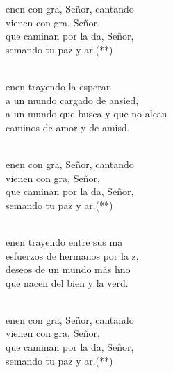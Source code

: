 \begin{cancion}%
	\begin{chorus}%
	enen con gra, Señor, cantando\\
	vienen con gra, Señor,\\
	 que caminan por la da, Señor,\\
	semando tu paz y ar.(**)\\
	\end{chorus}%
	\jump\\
	enen trayendo la esperan\\
	a un mundo cargado de ansied,\\
	a un mundo que busca y que no alcan\\
	caminos de amor y de amisd.\\\jump\\
	\begin{chorus}%
	enen con gra, Señor, cantando\\
	vienen con gra, Señor,\\
	 que caminan por la da, Señor,\\
	semando tu paz y ar.(**)\\
	\end{chorus}%
	\jump\\
	enen trayendo entre sus ma\\
	esfuerzos de hermanos por la z,\\
	deseos de un mundo más hno\\
	que nacen del bien y la verd.\\\jump\\
	\begin{chorus}%
	enen con gra, Señor, cantando\\
	vienen con gra, Señor,\\
	 que caminan por la da, Señor,\\
	semando tu paz y ar.(**)\\
	\end{chorus}%

\end{cancion}
